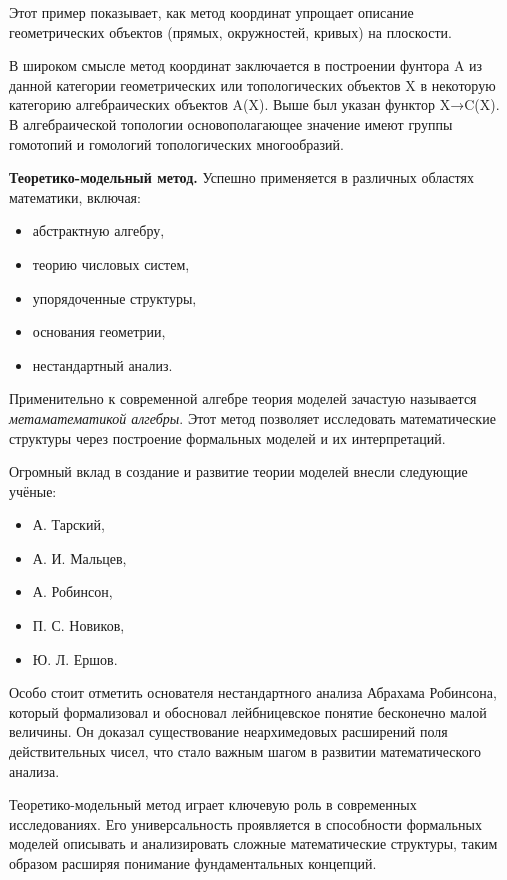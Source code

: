 Этот пример показывает, как метод координат упрощает описание геометрических объектов (прямых, окружностей, кривых) на плоскости.

В широком смысле метод координат заключается в построении фунтора A из данной категории геометрических или топологических объектов X в некоторую категорию алгебраических объектов A(X). Выше был указан функтор X→C(X). В алгебраической топологии основополагающее значение имеют группы гомотопий и гомологий топологических многообразий.


\textbf{Теоретико-модельный метод.}  Успешно применяется в различных областях математики, включая:

\begin{itemize}
    \item абстрактную алгебру,
    \item теорию числовых систем,
    \item упорядоченные структуры,
    \item основания геометрии,
    \item нестандартный анализ.
\end{itemize}

Применительно к современной алгебре теория моделей зачастую называется \textit{метаматематикой алгебры}. Этот метод позволяет исследовать математические структуры через построение формальных моделей и их интерпретаций.

Огромный вклад в создание и развитие теории моделей внесли следующие учёные:
\begin{itemize}
    \item А. Тарский,
    \item А. И. Мальцев,
    \item А. Робинсон,
    \item П. С. Новиков,
    \item Ю. Л. Ершов.
\end{itemize}

Особо стоит отметить основателя нестандартного анализа Абрахама Робинсона, который формализовал и обосновал лейбницевское понятие бесконечно малой величины. Он доказал существование неархимедовых расширений поля действительных чисел, что стало важным шагом в развитии математического анализа.

Теоретико-модельный метод играет ключевую роль в современных исследованиях. Его универсальность проявляется в способности формальных моделей описывать и анализировать сложные математические структуры, таким образом расширяя понимание фундаментальных концепций.

